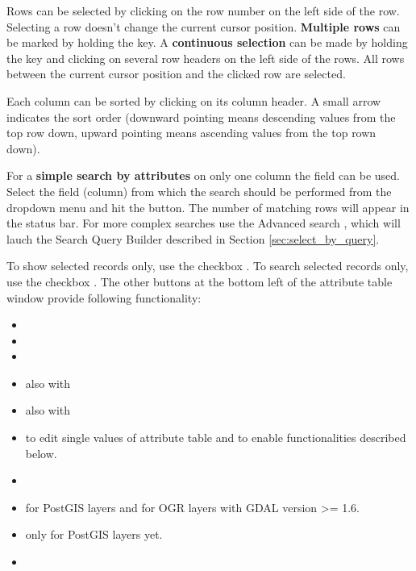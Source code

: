 Rows can be selected by clicking on the row number on the left side of the 
row. Selecting a row doesn't change the current cursor position. \textbf{Multiple 
rows} can be marked by holding the  key. A \textbf{continuous 
selection} can be made by holding the  key and clicking on several 
row headers on the left side of the rows. All rows between the current cursor 
position and the clicked row are selected.

Each column can be sorted by clicking on its column header. A small arrow 
indicates the sort order (downward pointing means descending values from the top 
row down, upward pointing means ascending values from the top rown down).
 
For a \textbf{simple search by attributes} on only one column the  
field can be used. Select the field (column) from which the search should be 
performed from the dropdown menu and hit the  button. The number of 
matching rows will appear in the status bar. For more complex searches use 
the Advanced search , which will lauch the Search Query Builder 
described in Section \ref{sec:select_by_query}.  

To show selected records only, use the checkbox . To search selected records only, use the checkbox . The other buttons at the bottom left of the attribute table window provide following functionality: 

\begin{itemize}[label=--]
\item {}
\item {}
\item {}
\item {} also with 
\item {} also with 
\item {} to edit single values 
of attribute table and to enable functionalities described below.
\item {}
\item {} for PostGIS layers and for OGR layers with GDAL version >= 1.6.
\item {} only for PostGIS layers yet.
\item {} 
\end{itemize}

